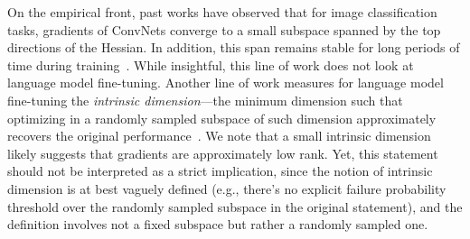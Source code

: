 On the empirical front, past works have observed that for image classification tasks, gradients of ConvNets converge to a small subspace spanned by the top directions of the Hessian. In addition, this span remains stable for long periods of time during training~\cite{gur2018gradient}.
While insightful, this line of work does not look at language model fine-tuning.
Another line of work measures for language model fine-tuning the \emph{intrinsic dimension}---the minimum dimension such that optimizing in a randomly sampled subspace of such dimension approximately recovers the original performance~\cite{li2018measuring,aghajanyan2020intrinsic}. 
We note that a small intrinsic dimension likely suggests that gradients are approximately low rank. 
Yet, this statement should not be interpreted as a strict implication, since the notion of intrinsic dimension is at best vaguely defined (e.g., there's no explicit failure probability threshold over the randomly sampled subspace in the original statement), and the definition involves not a fixed subspace but rather a randomly sampled one.
